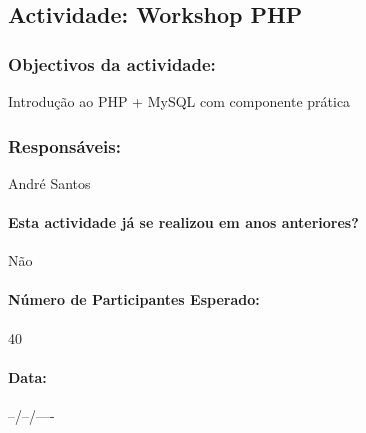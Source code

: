 \subsection{Actividade: Workshop PHP} %

\subsubsection*{Objectivos da actividade:}
Introdução ao PHP + MySQL com componente prática

\subsubsection*{Responsáveis:}
\begin{itemizedash}
	\item{André Santos}
\end{itemizedash}

\paragraph{Esta actividade já se realizou em anos anteriores?}
Não

\paragraph{Número de Participantes Esperado:}
40

\paragraph{Data:} --/--/----

\vspace{20pt}
